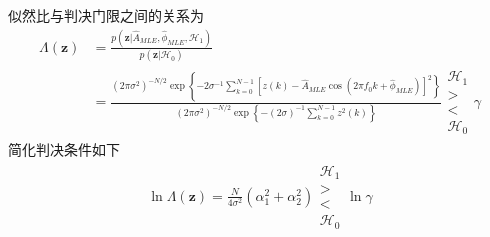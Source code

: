 \documentclass[fontset=windows]{article}
\numberwithin{figure}{section}
\begin{document}
似然比与判决门限之间的关系为
\begin{align*}
    \Lambda(\mathbf{z})
     & =\frac{p(\mathbf{z}|\hat{A}_{MLE},\hat{\phi}_{MLE},\mathcal{H}_1)}{p(\mathbf{z}|\mathcal{H}_0)}                                                                                                                                    \\
     & =\frac{(2\pi \sigma^2)^{-N/2}\exp\left\{-2\sigma^{-1}\sum_{k=0}^{N-1}\left[z(k)-\hat{A}_{MLE}\cos(2\pi f_0k+\hat{\phi}_{MLE})\right]^2 \right\}}{(2\pi \sigma^2)^{-N/2}\exp\left\{-(2\sigma)^{-1} \sum_{k=0}^{N-1}z^2(k) \right\}}
    \begin{matrix}
        \mathcal{H}_1 \\>\\<\\\mathcal{H}_0
    \end{matrix}
    \gamma
\end{align*}
简化判决条件如下
\begin{align*}
    \ln \Lambda(\mathbf{z})=\frac{N}{4\sigma^2}(\alpha^2_1+\alpha^2_2)
    \begin{matrix}
        \mathcal{H}_1 \\>\\<\\\mathcal{H}_0
    \end{matrix}
    \ln\gamma
\end{align*}
\end{document}
